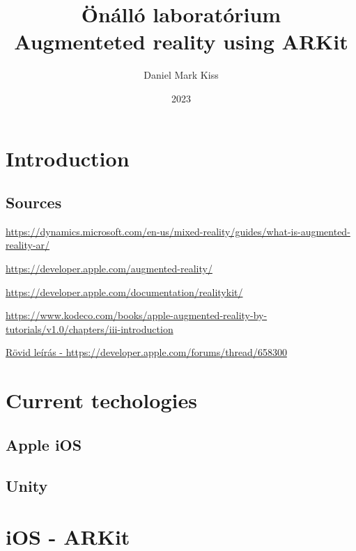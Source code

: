 \documentclass{report}
\title{\Huge{Önálló laboratórium}\\Augmenteted reality using ARKit}
\author{\huge{Daniel Mark Kiss}}
\date{2023}
\begin{document}
\maketitle
\newpage
\tableofcontents
\pagebreak

\chapter{Introduction}
\section{Sources}

\hyperlink{https://dynamics.microsoft.com/en-us/mixed-reality/guides/what-is-augmented-reality-ar/}{https://dynamics.microsoft.com/en-us/mixed-reality/guides/what-is-augmented-reality-ar/}

\hyperlink{https://developer.apple.com/augmented-reality/}{https://developer.apple.com/augmented-reality/}

\hyperlink{https://developer.apple.com/documentation/realitykit/}{https://developer.apple.com/documentation/realitykit/}

\hyperlink{https://www.kodeco.com/books/apple-augmented-reality-by-tutorials/v1.0/chapters/iii-introduction}{https://www.kodeco.com/books/apple-augmented-reality-by-tutorials/v1.0/chapters/iii-introduction}

\hyperlink{https://developer.apple.com/forums/thread/658300}{Rövid leírás - https://developer.apple.com/forums/thread/658300}

\chapter{Current techologies}

\section{Apple iOS}

\section{Unity}

\chapter{iOS - ARKit}
\end{document}
